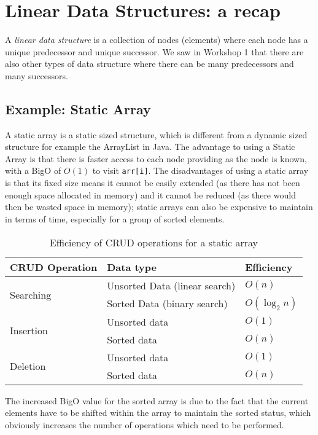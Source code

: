 
\section{Linear Data Structures: a recap}
A \textit{linear data structure} is a collection of nodes (elements) where each node has a unique predecessor and unique successor. We saw in Workshop 1 that there are also other types of data structure where there can be many predecessors and many successors.
\subsection{Example: Static Array}
A static array is a static sized structure, which is different from a dynamic sized structure for example the ArrayList in Java. The advantage to using a Static Array is that there is faster access to each node providing as the node is known, with a BigO of $O(1)$ to visit \verb|arr[i]|. The disadvantages of using a static array is that its fixed size means it cannot be easily extended (as there has not been enough space allocated in memory) and it cannot be reduced (as there would then be wasted space in memory); static arrays can also be expensive to maintain in terms of time, especially for a group of sorted elements.

\begin{table}[H]
    \centering
    {\RaggedRight
    \begin{tabular}{p{}p{}p{}}
    \textbf{CRUD Operation} & \textbf{Data type} & \textbf{Efficiency}\\
    \hline
    \hline
    \multirow{2}{*}{Searching} & Unsorted Data (linear search) & $O(n)$\\
    \cline{2-3}
    & Sorted Data (binary search) & $O(\log_2n)$\\
    \hline
    \multirow{2}{*}{Insertion} & Unsorted data & $O(1)$\\
    \cline{2-3}
     & Sorted data & $O(n)$\\
    \hline
    \multirow{2}{*}{Deletion} & Unsorted data & $O(1)$\\
    \cline{2-3}
     & Sorted data & $O(n)$\\
     \hline
    \end{tabular}
    } %
    \caption{Efficiency of CRUD operations for a static array}
\end{table}
The increased BigO value for the sorted array is due to the fact that the current elements have to be shifted within the array to maintain the sorted status, which obviously increases the number of operations which need to be performed.

